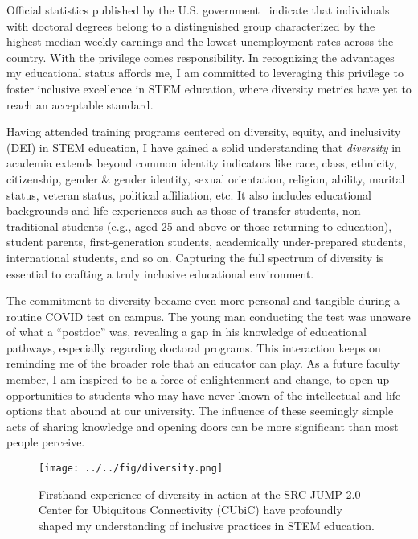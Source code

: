 Official statistics published by the U.S. government~\cite{EducationPaysBureau} indicate that individuals with doctoral degrees belong to a distinguished group characterized by the highest median weekly earnings and the lowest unemployment rates across the country. With the privilege comes responsibility. In recognizing the advantages my educational status affords me, I am committed to leveraging this privilege to foster inclusive excellence in STEM education, where diversity metrics have yet to reach an acceptable standard.

Having attended training programs centered on diversity, equity, and inclusivity (DEI) in STEM education, I have gained a solid understanding that \emph{diversity} in academia extends beyond common identity indicators like race, class, ethnicity, citizenship, gender \& gender identity, sexual orientation, religion, ability, marital status, veteran status, political affiliation, etc. It also includes educational backgrounds and life experiences such as those of transfer students, non-traditional students (e.g., aged 25 and above or those returning to education), student parents, first-generation students, academically under-prepared students, international students, and so on. Capturing the full spectrum of diversity is essential to crafting a truly inclusive educational environment.

The commitment to diversity became even more personal and tangible during a routine COVID test on campus. The young man conducting the test was unaware of what a ``postdoc'' was, revealing a gap in his knowledge of educational pathways, especially regarding doctoral programs. This interaction keeps on reminding me of the broader role that an educator can play. As a future faculty member, I am inspired to be a force of enlightenment and change, to open up opportunities to students who may have never known of the intellectual and life options that abound at our university. The influence of these seemingly simple acts of sharing knowledge and opening doors can be more significant than most people perceive.

\begin{figure}[!ht]
    \centering
    \texttt{[image: ../../fig/diversity.png]}
    \caption{Firsthand experience of diversity in action at the SRC JUMP 2.0 Center for Ubiquitous Connectivity (CUbiC) have profoundly shaped my understanding of inclusive practices in STEM education.}
    \label{fig:diversity}
\end{figure}

